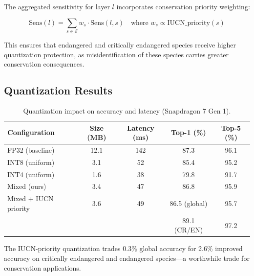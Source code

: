 The aggregated sensitivity for layer $l$ incorporates conservation priority weighting:

\begin{equation}
    \text{Sens}(l) = \sum_{s \in \mathcal{S}} w_s \cdot \text{Sens}(l, s) \quad \text{where } w_s \propto \text{IUCN\_priority}(s)
\end{equation}

This ensures that endangered and critically endangered species receive higher quantization protection, as misidentification of these species carries greater conservation consequences.

\subsection{Quantization Results}

\begin{table}[H]
\centering
\caption{Quantization impact on accuracy and latency (Snapdragon 7 Gen 1).}
\label{tab:quantization}
\begin{tabular}{@{}lcccc@{}}
\toprule
\textbf{Configuration} & \textbf{Size (MB)} & \textbf{Latency (ms)} & \textbf{Top-1 (\%)} & \textbf{Top-5 (\%)} \\
\midrule
FP32 (baseline) & 12.1 & 142 & 87.3 & 96.1 \\
INT8 (uniform) & 3.1 & 52 & 85.4 & 95.2 \\
INT4 (uniform) & 1.6 & 38 & 79.8 & 91.7 \\
Mixed (ours) & 3.4 & 47 & 86.8 & 95.9 \\
Mixed + IUCN priority & 3.6 & 49 & 86.5 (global) & 95.7 \\
 & & & 89.1 (CR/EN) & 97.2 \\
\bottomrule
\end{tabular}
\end{table}

The IUCN-priority quantization trades 0.3\% global accuracy for 2.6\% improved accuracy on critically endangered and endangered species---a worthwhile trade for conservation applications.

